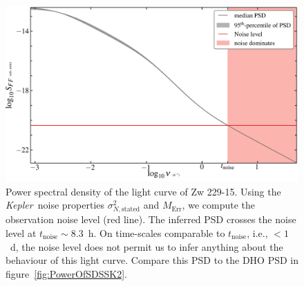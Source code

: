 \documentclass[a4paper,fleqn,usenatbib]{mnras}
\newcommand{\Kepler}{\textit{Kepler~}}
\begin{document}
\begin{figure}
    \includegraphics[width=\textwidth]{Figure3.jpg}
    \caption{Power spectral density of the light curve of Zw 229-15. Using the \Kepler noise properties $\sigma^{2}_{N,\mathrm{stated}}$ and $M_{\mathrm{Err}}$, we compute the observation noise level (red line). The inferred PSD crosses the noise level at $t_{\mathrm{noise}} \sim 8.3$~h. On time-scales comparable to $t_{\mathrm{noise}}$, i.e., $< 1$~d, the noise level does not permit us to infer anything about the behaviour of this light curve. Compare this PSD to the DHO PSD in figure~\ref{fig:PowerOfSDSSK2}.}
    \label{fig:Zw229-15_PSD}
\end{figure}
\end{document}
